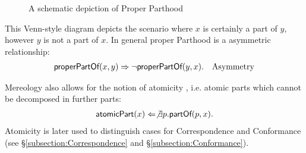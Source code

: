 \begin{figure}[h!]
\begin{center}
\end{center}
\caption{A schematic depiction of Proper Parthood}
\label{figure:SchematicProperPart}
\end{figure}
This Venn-style diagram depicts the scenario where $x$ is certainly a part of $y$, however $y$ is not a part of $x$.
In general proper \gls{Parthood} is a asymmetric relationship:
\begin{align*}
&\textsf{properPartOf}(x,y) 
\Rightarrow
\neg \textsf{properPartOf}(y,x).
&\text{Asymmetry}
\end{align*}

\Gls{Mereology} also allows for the notion of atomicity \cite{DBLP:journals/dke/Varzi96} \cite{SEP:Mereology}, i.e. atomic parts which cannot be decomposed in further parts:
\begin{align*}
\textsf{atomicPart}(x)
\Leftarrow
\not \exists p.\textsf{partOf}(p,x).
\end{align*}
Atomicity is later used to distinguish cases for \gls{Correspondence} and \gls{Conformance} (see §\ref{subsection:Correspondence} and §\ref{subsection:Conformance}).

